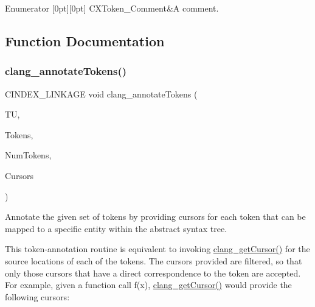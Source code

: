 \begin{DoxyEnumFields}{Enumerator}
[0pt][0pt]{}\mbox{\label{group__CINDEX__LEX_ggaf63e37eee4280e2c039829af24bbc201a6a24a53d8d4a4aa6e4bcb4847c9652f3}} 
C\+X\+Token\+\_\+\+Comment&A comment. \\
\hline

\end{DoxyEnumFields}


\subsection{Function Documentation}
\mbox{\label{group__CINDEX__LEX_gadc0c15904e61902b73e02700af0863a0}} 
\subsubsection{\texorpdfstring{clang\+\_\+annotate\+Tokens()}{clang\_annotateTokens()}}
{\footnotesize\ttfamily C\+I\+N\+D\+E\+X\+\_\+\+L\+I\+N\+K\+A\+GE void clang\+\_\+annotate\+Tokens (\begin{DoxyParamCaption}\item[{\hyperlink{group__CINDEX_gacdb7815736ca709ce9a5e1ec2b7e16ac}{C\+X\+Translation\+Unit}}]{TU,  }\item[{\hyperlink{structCXToken}{C\+X\+Token} $\ast$}]{Tokens,  }\item[{unsigned}]{Num\+Tokens,  }\item[{\hyperlink{structCXCursor}{C\+X\+Cursor} $\ast$}]{Cursors }\end{DoxyParamCaption})}



Annotate the given set of tokens by providing cursors for each token that can be mapped to a specific entity within the abstract syntax tree. 

This token-\/annotation routine is equivalent to invoking \hyperlink{group__CINDEX__CURSOR__SOURCE_ga30a9972c7e099ab2735fa6c45e247ec8}{clang\+\_\+get\+Cursor()} for the source locations of each of the tokens. The cursors provided are filtered, so that only those cursors that have a direct correspondence to the token are accepted. For example, given a function call {\ttfamily f(x)}, \hyperlink{group__CINDEX__CURSOR__SOURCE_ga30a9972c7e099ab2735fa6c45e247ec8}{clang\+\_\+get\+Cursor()} would provide the following cursors\+:


